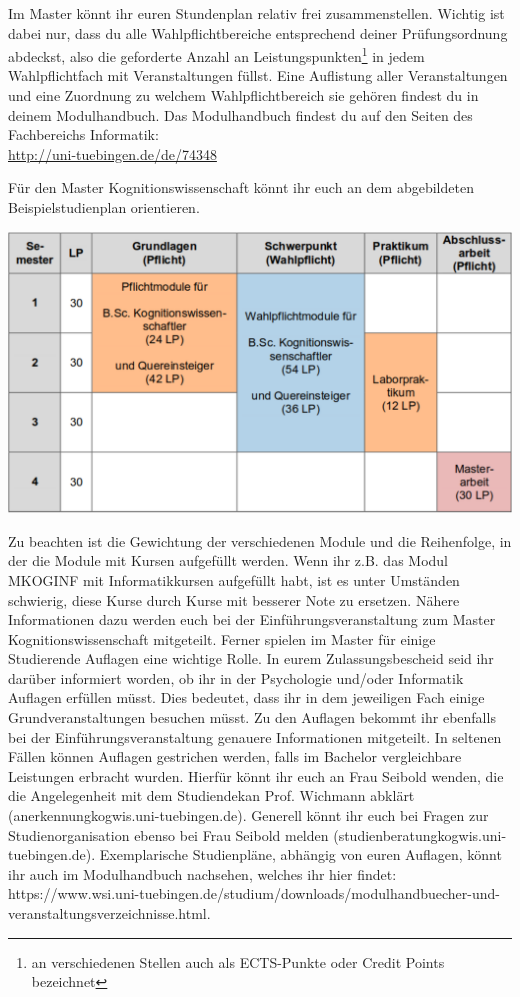 Im Master könnt ihr euren Stundenplan relativ frei zusammenstellen.
Wichtig ist dabei nur, dass du alle Wahlpflichtbereiche entsprechend deiner Prüfungsordnung abdeckst,
also die geforderte Anzahl an Leistungspunkten\footnote{an verschiedenen Stellen auch als ECTS-Punkte oder Credit Points bezeichnet}
in jedem Wahlpflichtfach mit Veranstaltungen füllst.
Eine Auflistung aller Veranstaltungen und eine Zuordnung zu welchem Wahlpflichtbereich sie gehören
findest du in deinem Modulhandbuch. Das Modulhandbuch findest du auf den Seiten des Fachbereichs Informatik: \\ 
\url{http://uni-tuebingen.de/de/74348}

\ifkogwiss
Für den Master Kognitionswissenschaft könnt ihr euch an dem abgebildeten Beispielstudienplan orientieren.
\begin{center}
	\includegraphics[width=.8\textwidth]{media/studienplan_kmsc.pdf}
\end{center}
Zu beachten ist die Gewichtung der verschiedenen Module und die Reihenfolge, in der die Module mit Kursen aufgefüllt werden. Wenn
ihr z.B. das Modul MKOGINF mit Informatikkursen aufgefüllt habt, ist es unter Umständen schwierig, diese Kurse durch Kurse mit
besserer Note zu ersetzen. Nähere Informationen dazu werden euch bei der Einführungsveranstaltung zum Master Kognitionswissenschaft mitgeteilt. Ferner spielen im Master für einige Studierende Auflagen eine wichtige Rolle. In eurem Zulassungsbescheid seid ihr darüber informiert worden, ob ihr in der Psychologie und/oder Informatik Auflagen erfüllen müsst. Dies bedeutet, dass ihr in dem jeweiligen Fach einige Grundveranstaltungen besuchen müsst. Zu den Auflagen bekommt ihr ebenfalls bei der Einführungsveranstaltung genauere Informationen mitgeteilt. In seltenen Fällen können Auflagen gestrichen werden, falls im Bachelor vergleichbare Leistungen erbracht wurden. Hierfür könnt ihr euch an Frau Seibold wenden, die die Angelegenheit mit dem Studiendekan Prof. Wichmann abklärt (anerkennung\At kogwis.uni-tuebingen.de). Generell könnt ihr euch bei Fragen zur Studienorganisation ebenso bei Frau Seibold melden (studienberatung\At kogwis.uni-tuebingen.de). Exemplarische Studienpläne, abhängig von euren Auflagen, könnt ihr auch im Modulhandbuch nachsehen, welches ihr hier findet: https://www.wsi.uni-tuebingen.de/studium/downloads/modulhandbuecher-und-veranstaltungsverzeichnisse.html.


